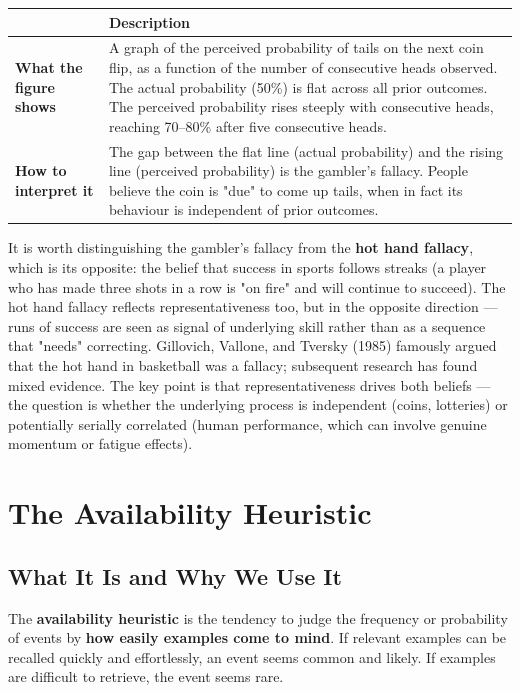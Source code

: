 \documentclass[12pt, letterpaper]{article}
\begin{document}
\begin{table}[H]
\centering
\small
\begin{tabularx}{\linewidth}{lY}
\toprule
 & Description \\
\midrule
\textbf{What the figure shows} & A graph of the perceived probability of tails on the next coin flip, as a function of the number of consecutive heads observed. The actual probability (50\%) is flat across all prior outcomes. The perceived probability rises steeply with consecutive heads, reaching 70--80\% after five consecutive heads. \\
\textbf{How to interpret it} & The gap between the flat line (actual probability) and the rising line (perceived probability) is the gambler's fallacy. People believe the coin is "due" to come up tails, when in fact its behaviour is independent of prior outcomes. \\
\bottomrule
\end{tabularx}
\end{table}


It is worth distinguishing the gambler's fallacy from the \textbf{hot hand fallacy}, which is its opposite: the belief that success in sports follows streaks (a player who has made three shots in a row is "on fire" and will continue to succeed). The hot hand fallacy reflects representativeness too, but in the opposite direction --- runs of success are seen as signal of underlying skill rather than as a sequence that "needs" correcting. Gillovich, Vallone, and Tversky (1985) famously argued that the hot hand in basketball was a fallacy; subsequent research has found mixed evidence. The key point is that representativeness drives both beliefs --- the question is whether the underlying process is independent (coins, lotteries) or potentially serially correlated (human performance, which can involve genuine momentum or fatigue effects).

\medskip


\section{The Availability Heuristic}



\subsection{What It Is and Why We Use It}


The \textbf{availability heuristic} is the tendency to judge the frequency or probability of events by \textbf{how easily examples come to mind}. If relevant examples can be recalled quickly and effortlessly, an event seems common and likely. If examples are difficult to retrieve, the event seems rare.
\end{document}

